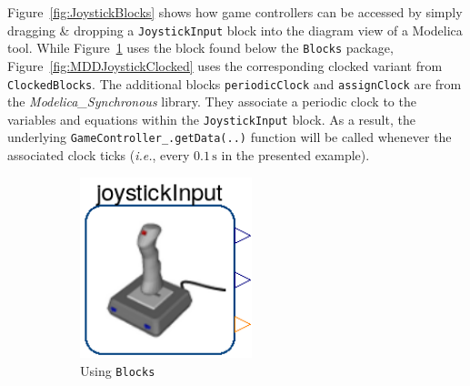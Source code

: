 \documentclass{resources/modelica}
\newcommand{\modelica}[1]{\lstinline[language=modelica]|#1|}
\begin{document}
Figure~\ref{fig:JoystickBlocks} shows how game controllers can be accessed by
simply dragging \& dropping a \modelica{JoystickInput} block into the diagram
view of a Modelica tool. While Figure~\ref{fig:MDDJoystick} uses the block found
below the \modelica{Blocks} package,
Figure~\ref{fig:MDDJoystickClocked} uses the corresponding clocked variant from
\modelica{ClockedBlocks}. The additional blocks \modelica{periodicClock} and
\modelica{assignClock} are from the \emph{Modelica\_Synchronous} library. They
associate a periodic clock to the variables and equations within the
\modelica{JoystickInput} block. As a result, the underlying
\modelica{GameController_.getData(..)} function will be called whenever the
associated clock ticks (\textit{i.e.}, every $0.1\,\mathrm{s}$ in the presented
example).

\begin{figure}[htb]
  \centering
  \begin{subfigure}[b]{0.45\columnwidth}
     \centering
     \includegraphics[width=0.55\textwidth]{figures/MDDJoystick}
     \caption{Using \modelica{Blocks}}
     \label{fig:MDDJoystick}
  \end{subfigure}%
  ~ %
  \begin{subfigure}[b]{0.45\columnwidth}

\end{subfigure}
\end{figure}
\end{document}
